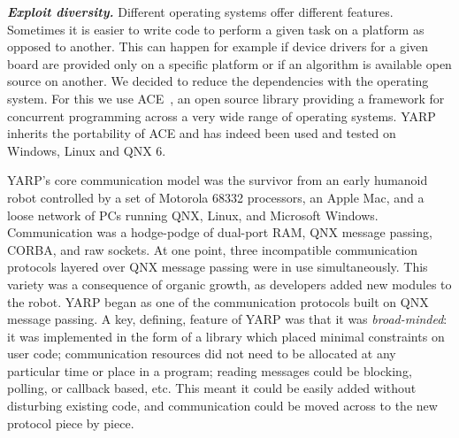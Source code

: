 \noindent
%
%
\textit{\textbf{Exploit diversity.}}
%
Different operating systems offer different
features. Sometimes it is easier to write code to perform a given task
on a platform as opposed to another. This can happen for example if 
device drivers for a given board are provided only on a specific platform or
if an algorithm is available open source on another. We decided to reduce the
dependencies with the operating system. For this we
use ACE~\cite{ACEBook}, an open source library providing a framework for
concurrent programming across a very wide range of operating
systems. YARP inherits the portability of ACE and has indeed been used and
tested on Windows, Linux and QNX 6.



YARP's core communication model was the survivor from an early humanoid robot
controlled by a set of Motorola 68332 processors, an Apple Mac, and a loose network
of PCs running QNX, Linux, and Microsoft Windows.  Communication was a
hodge-podge of dual-port RAM, QNX message passing, CORBA, and raw
sockets.  At one point, three incompatible communication protocols
layered over QNX message passing were in use simultaneously.  This
variety was a consequence of organic growth, as developers added new
modules to the robot.  YARP began as one of the communication
protocols built on QNX message passing.  A key, defining, feature of
YARP was that it was {\em broad-minded}: it was
implemented in the form of a library which placed minimal constraints
on user code; communication resources did not need to be allocated at
any particular time or place in a program; reading messages could be
blocking, polling, or callback based, etc. This meant it could be
easily added without disturbing existing code, and communication could
be moved across to the new protocol piece by piece.

%


